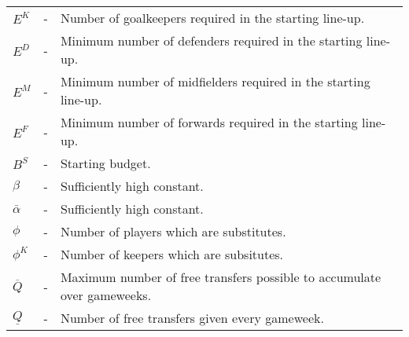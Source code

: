 \begin{table}[H]
\begin{tabular}{@{}lll@{}}
$E^{K}$                          & - & Number of goalkeepers required in the starting line-up.                                           \\
$E^{D}$                          & - & Minimum number of defenders required in the starting line-up.                                     \\
$E^{M}$                          & - & Minimum number of midfielders required in the starting line-up.                                   \\
$E^{F}$                          & - & Minimum number of forwards required in the starting line-up.                                      \\
$B^{S}$                          & - & Starting budget.                                                                               \\
$\beta$                          & - & Sufficiently high constant.                                                                                  \\          
$\bar{\alpha}$                   & - & Sufficiently high constant.                                                                      \\

$\phi$                         & - & Number of players which are substitutes.                                                         \\
$\phi^{K}$                   & - & Number of keepers which are subsitutes.                                                          \\
$\overline{Q}$                   & - & Maximum number of free transfers possible to accumulate over gameweeks.                        \\
$\underline{Q}$                  & - & Number of free transfers given every gameweek.                                                 \\ \bottomrule
\end{tabular}
\end{table}


